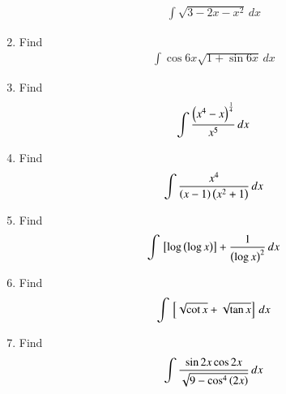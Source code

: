 \begin{enumerate}[label=\arabic*.,ref=\thesubsection.\theenumi]
\begin{align}
\int \sqrt{3-2x-x^2}\,dx
\end{align}
\item Find
\begin{align}
\int\cos  6x\sqrt{1+\sin6x} \,dx
\end{align}
%
\item Find
\begin{align}
\int \frac{\left(x^4-x\right)^{\frac{1}{4}}}{x^5} \,dx
\end{align}
%
\item Find
\begin{align}
\int \frac{x^4}{\left(x-1\right)\left(x^2+1\right)} \,dx
\end{align}
%
\item Find
\begin{align}
\int {}\left[\log \left(\log x\right)\right]+\frac{1}{\left(\log x\right)^2} \,dx
\end{align}
%
\item Find
\begin{align}
\int {}\left[\sqrt{\cot x} + \sqrt{\tan x} \right]\,dx
\end{align}
%
\item Find
\begin{align}
\int \frac{\sin 2x \cos 2x }{\sqrt{9-\cos^4\left(2x\right)}}\,dx
\end{align}

\end{enumerate}
